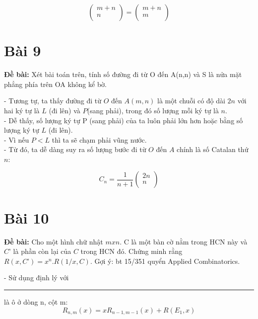 \documentclass[12pt]{article}
\newcommand\crule[3][black]{\textcolor{#1}{\rule{#2}{#3}}}
\begin{document}
\begin{sloppypar}
\begin{equation*}
    \begin{pmatrix} m + n \\ n \\ \end{pmatrix} = \begin{pmatrix} m + n \\ m \\ \end{pmatrix}
\end{equation*}
\section{Bài 9}
\begin{tcolorbox}
    \textbf{Đề bài:} Xét bài toán trên, tính số đường đi từ O đến A(n,n) và S là nửa mặt phẳng phía trên OA không kể bờ.
\end{tcolorbox}

- Tương tự, ta thấy đường đi từ \(O\) đến \(A(m,n)\) là một chuỗi có độ dài \(2n\) với hai ký tự là \(L\) (đi lên) và \(P\)(sang phải), trong đó số lượng mỗi ký tự là \(n\). \\
- Dễ thấy, số lượng ký tự P (sang phải) của ta luôn phải lớn hơn hoặc bằng số lượng ký tự \(L\) (đi lên). \\
- Vì nếu \(P < L\) thì ta sẽ chạm phải vũng nước. \\
- Từ đó, ta dễ dàng suy ra số lượng bước đi từ \(O\) đến \(A\) chính là số Catalan thứ \(n\):

\begin{equation*}
    C_{n} = \frac{1}{n+1}\begin{pmatrix} 2n \\ n \\ \end{pmatrix}
\end{equation*}

\section{Bài 10}
\begin{tcolorbox}
    \textbf{Đề bài:} Cho một hình chữ nhật \(mxn\). C là một bàn cờ nằm trong HCN này và \(C’\) là phần còn lại của \(C\) trong HCN đó.
    Chứng minh rằng \(R(x,C’)=x^{n} .R(1/x,C)\). Gợi ý: bt 15/351 quyển Applied Combinatorics.
\end{tcolorbox}

- Sử dụng định lý với \crule[cyan]{0.3cm}{0.3cm} là ô ở dòng n, cột m:
\begin{equation*}
    R_{n,m}(x) = xR_{n-1,m-1}(x) + R(E_{1},x)
\end{equation*}


\end{sloppypar}
\end{document}
